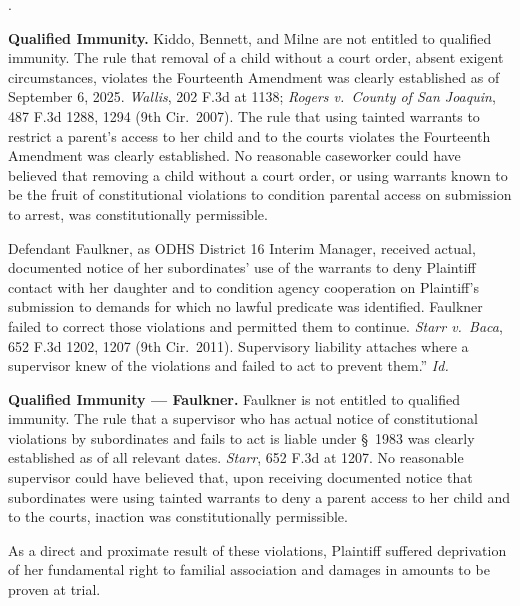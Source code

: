 \documentclass[12pt,letterpaper]{article}
\newcounter{complaintpara}
\newenvironment{paras}{%
	\begin{list}{\arabic{complaintpara}.}{%
			\setlength{\leftmargin}{0.5in}%
			\setlength{\labelwidth}{0.4in}%
			\setlength{\labelsep}{0.1in}%
			\setlength{\itemsep}{0pt}%
			\setlength{\parsep}{0pt}%
			\setlength{\topsep}{6pt}%
		}%
	}{%
	\end{list}%
}
\newcommand{\sect}{§}
\begin{document}
\begin{paras}
		\item \textbf{Qualified Immunity.} Kiddo, Bennett, and Milne
		are not entitled to qualified immunity. The rule that removal
		of a child without a court order, absent exigent
		circumstances, violates the Fourteenth Amendment was clearly
		established as of September 6, 2025.
		\textit{Wallis}, 202 F.3d at 1138;
		\textit{Rogers v.\ County of San Joaquin},
		487 F.3d 1288, 1294 (9th Cir.\ 2007). The rule that using
		tainted warrants to restrict a parent's access to her child
		and to the courts violates the Fourteenth Amendment was
		clearly established. No reasonable caseworker could have
		believed that removing a child without a court order, or
		using warrants known to be the fruit of constitutional
		violations to condition parental access on submission to
		arrest, was constitutionally permissible.
		
		\item Defendant Faulkner, as ODHS District 16 Interim Manager,
		received actual, documented notice of her subordinates' use
		of the warrants to deny Plaintiff contact with her daughter
		and to condition agency cooperation on Plaintiff's submission
		to demands for which no lawful predicate was identified.
		Faulkner failed to correct those violations and permitted
		them to continue. \textit{Starr v.\ Baca}, 652 F.3d 1202,
		1207 (9th Cir.\ 2011). Supervisory liability attaches where
		a supervisor knew of the violations and failed to act to
		prevent them.'' \textit{Id.}
		
		\item \textbf{Qualified Immunity --- Faulkner.} Faulkner is not
		entitled to qualified immunity. The rule that a supervisor
		who has actual notice of constitutional violations by
		subordinates and fails to act is liable under \sect\ 1983
		was clearly established as of all relevant dates.
		\textit{Starr}, 652 F.3d at 1207. No reasonable supervisor
		could have believed that, upon receiving documented notice
		that subordinates were using tainted warrants to deny a
		parent access to her child and to the courts, inaction was
		constitutionally permissible.
		
		\item As a direct and proximate result of these violations,
		Plaintiff suffered deprivation of her fundamental right to
		familial association and damages in amounts to be proven at
		trial.
		
	\end{paras}
\end{document}
